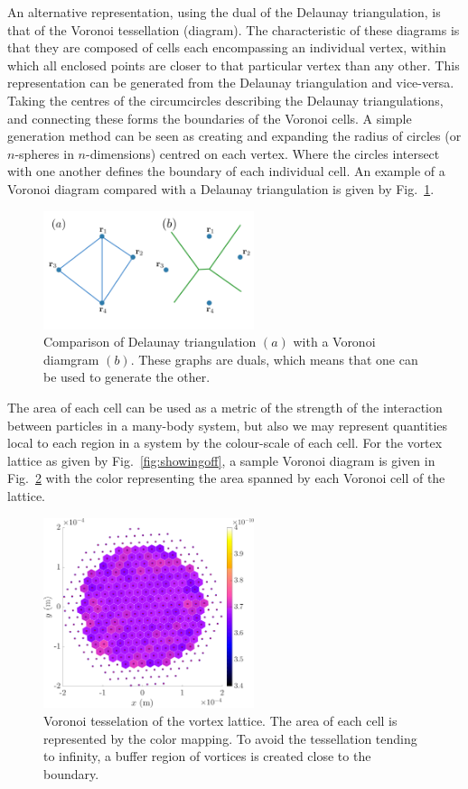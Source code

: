 An alternative representation, using the dual of the Delaunay triangulation, is that of the Voronoi tessellation (diagram). The characteristic of these diagrams is that they are composed of cells each encompassing an individual vertex, within which all enclosed points are closer to that particular vertex than any other. This representation can be generated from the Delaunay triangulation and vice-versa. Taking the centres of the circumcircles describing the Delaunay triangulations, and connecting these forms the boundaries of the Voronoi cells. A simple generation method can be seen as creating and expanding the radius of circles (or $n$-spheres in $n$-dimensions) centred on each vertex. Where the circles intersect with one another defines the boundary of each individual cell. An example of a Voronoi diagram compared with a Delaunay triangulation is given by Fig.~\ref{fig:Voronoi}.
\begin{figure}\centering
    \includegraphics[width=0.55\textwidth]{Images/ch6_phasegineer/imgs/voronoi}
    \caption{Comparison of Delaunay triangulation $(a)$ with a Voronoi diamgram $(b)$. These graphs are duals, which means that one can be used to generate the other.}\label{fig:Voronoi}
\end{figure}
The area of each cell can be used as a metric of the strength of the interaction between particles in a many-body system, but also we may represent quantities local to each region in a system by the colour-scale of each cell. For the vortex lattice as given by Fig.~\ref{fig:showingoff}, a sample Voronoi diagram is given in Fig.~\ref{fig:voron_vtxlatt} with the color representing the area spanned by each Voronoi cell of the lattice.

\begin{figure}\centering
    \includegraphics[width=0.55\textwidth]{Images/ch4_vtx/Voronoi_area_VTXLATT}
    \caption{Voronoi tesselation of the vortex lattice. The area of each cell is represented by the color mapping. To avoid the tessellation tending to infinity, a buffer region of vortices is created close to the boundary. }\label{fig:voron_vtxlatt}
\end{figure}
